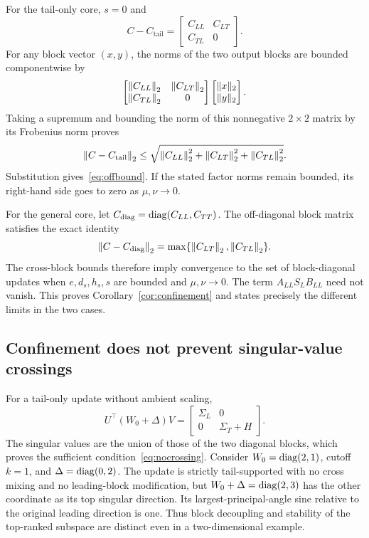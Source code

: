 For the tail-only core, $s=0$ and
\begin{equation}
C-C_{\mathrm{tail}}=\begin{bmatrix}C_{LL}&C_{LT}\\C_{TL}&0\end{bmatrix}.
\end{equation}
For any block vector $(x,y)$, the norms of the two output blocks are bounded componentwise by
\begin{equation}
\begin{bmatrix}\left\|C_{LL}\right\|_2&\left\|C_{LT}\right\|_2\\\left\|C_{TL}\right\|_2&0\end{bmatrix}
\begin{bmatrix}\|x\|_2\\\|y\|_2\end{bmatrix}.
\end{equation}
Taking a supremum and bounding the norm of this nonnegative $2\times2$ matrix by its Frobenius norm proves
\begin{equation}
\left\|C-C_{\mathrm{tail}}\right\|_2
\le\sqrt{\left\|C_{LL}\right\|_2^2+\left\|C_{LT}\right\|_2^2+\left\|C_{TL}\right\|_2^2}.
\end{equation}
Substitution gives~\eqref{eq:offbound}. If the stated factor norms remain bounded, its right-hand side goes to zero as $\mu,\nu\to0$.

For the general core, let $C_{\mathrm{diag}}=\operatorname{diag}(C_{LL},C_{TT})$. The off-diagonal block matrix satisfies the exact identity
\begin{equation}
\left\|C-C_{\mathrm{diag}}\right\|_2=\max\{\left\|C_{LT}\right\|_2,\left\|C_{TL}\right\|_2\}.
\end{equation}
The cross-block bounds therefore imply convergence to the set of block-diagonal updates when $e,d_s,h_s,s$ are bounded and $\mu,\nu\to0$. The term $A_{LL}S_LB_{LL}$ need not vanish. This proves Corollary~\ref{cor:confinement} and states precisely the different limits in the two cases.

\subsection{Confinement does not prevent singular-value crossings}
\label{app:crossing}
For a tail-only update without ambient scaling,
\begin{equation}
U^\top(W_0+\Delta)V=
\begin{bmatrix}\Sigma_L&0\\0&\Sigma_T+H\end{bmatrix}.
\end{equation}
The singular values are the union of those of the two diagonal blocks, which proves the sufficient condition~\eqref{eq:nocrossing}. Consider $W_0=\operatorname{diag}(2,1)$, cutoff $k=1$, and $\Delta=\operatorname{diag}(0,2)$. The update is strictly tail-supported with no cross mixing and no leading-block modification, but $W_0+\Delta=\operatorname{diag}(2,3)$ has the other coordinate as its top singular direction. Its largest-principal-angle sine relative to the original leading direction is one. Thus block decoupling and stability of the top-ranked subspace are distinct even in a two-dimensional example.

